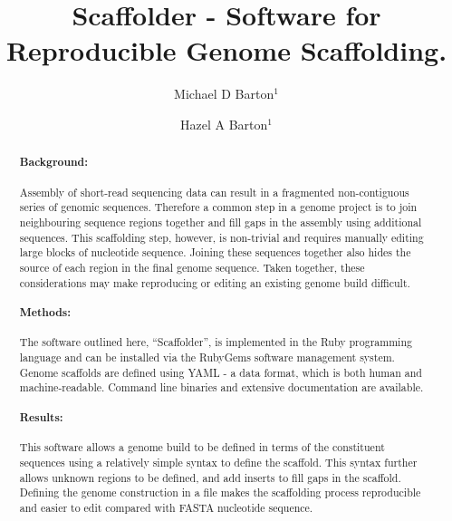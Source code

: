 \documentclass[10pt]{bmc_article}
\newenvironment{bmcformat}{\begin{raggedright}\baselineskip20pt\sloppy\setboolean{publ}{false}}{\end{raggedright}\baselineskip20pt\sloppy}
\begin{document}
\begin{bmcformat}

\title{Scaffolder - Software for Reproducible Genome Scaffolding.} %

\author{
  Michael D Barton$^{1}$\correspondingauthor%
\and
  Hazel A Barton$^1$%
      }

\address{\iid(1) Department of Biological Sciences, Northern Kentucky %
University, Nunn Drive, Highland Heights, KY 41076 }%

\maketitle

\clearpage

\begin{abstract} %

  \paragraph*{Background:} Assembly of short-read sequencing data can result in
  a fragmented non-contiguous series of genomic sequences. Therefore a common
  step in a genome project is to join neighbouring sequence regions together
  and fill gaps in the assembly using additional sequences. This scaffolding
  step, however, is non-trivial and requires manually editing large blocks of
  nucleotide sequence. Joining these sequences together also hides the source
  of each region in the final genome sequence. Taken together, these
  considerations may make reproducing or editing an existing genome build
  difficult.

  \paragraph*{Methods:} The software outlined here, ``Scaffolder'', is
  implemented in the Ruby programming language and can be installed via the
  RubyGems software management system. Genome scaffolds are defined using YAML
  - a data format, which is both human and machine-readable. Command line
  binaries and extensive documentation are available.

  \paragraph*{Results:} This software allows a genome build to be defined in
  terms of the constituent sequences using a relatively simple syntax to
  define the scaffold. This syntax further allows  unknown regions to be
  defined, and add inserts to fill gaps in the scaffold. Defining the genome
  construction in a file makes the scaffolding process reproducible and easier
  to edit compared with FASTA nucleotide sequence.


\end{abstract}
\end{bmcformat}
\end{document}
